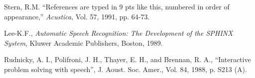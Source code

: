 \begin{references}
 Stern, R.M.
``References are typed in 9 pts like this, numbered in order of appearance,'' {\it Acustica}, Vol. 57, 1991, pp. 64-73.

 Lee-K.F., {\it Automatic Speech Recognition: The Development of the SPHINX System}, Kluwer Academic Publishers, Boston, 1989.

 Rudnicky, A. I., Polifroni, J. H., Thayer, E. H., and Brennan, R. A., ``Interactive problem solving with speech'', J. Aoust. Soc. Amer., Vol. 84, 1988, p. S213 (A).
\end{references}

